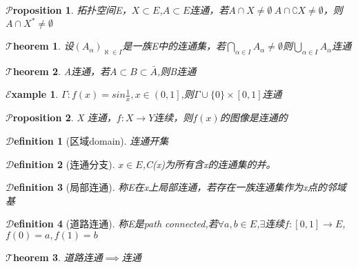 \documentclass[hyperfer,UTF8,a4paper,12pt]{article}
\theoremstyle{plain}
\newtheorem{Thm}{$\mathcal{T}$heorem}
\newtheorem*{Prop}{$\mathcal{P}$roposition}
\newtheorem{Def}{{$\mathcal{D}$efinition}}[section]
\newtheorem*{Example}{$\mathcal{E}$xample}
\begin{document}
\begin{Prop}
	拓扑空间E，$ X\subset E $,$ A\subset E$连通，若$ A\cap X\not=\emptyset\ A\cap\complement X\not=\emptyset $，则$ A\cap X^*\not=\emptyset $
\end{Prop}

\begin{Thm}
	设$ (A_\alpha)_{\aleph\in I} $是一族E中的连通集，若$ \bigcap\limits_{\alpha\in I}A_{\alpha}\not=\emptyset $则$  \bigcup\limits_{\alpha\in I}A_{\alpha} $连通
\end{Thm}

\begin{Thm}
	A连通，若$ A\subset B\subset \bar{A} $,则B连通
\end{Thm}

\begin{Example}
	$\Gamma: f(x)=sin\frac{1}{x},x\in \left(0,1\right] $,则$ \Gamma\cup\{0\}\times\left[0,1\right] $连通
\end{Example}

\begin{Prop}
	X 连通，$ f:X\to Y $连续，则$f(x)$的图像是连通的
\end{Prop}

\begin{Def}[区域domain]
	连通开集
\end{Def}

\begin{Def}[连通分支]
	$ x\in E $,C(x)为所有含x的连通集的并。
\end{Def}

\begin{Def}[局部连通]
	称E在x上局部连通，若存在一族连通集作为x点的邻域基
\end{Def}

\begin{Def}[道路连通]
	称E是path connected,若$ \forall a,b\in E $,$\exists$连续$ f:[0,1]\to E $,$ f(0)=a,f(1)=b $
\end{Def}

\begin{Thm}
	道路连通$\implies$连通
\end{Thm}
\end{document}
